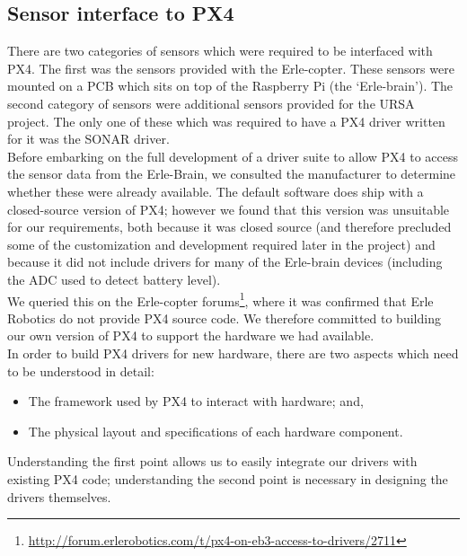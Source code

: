 \documentclass[capstone_report.tex]{subfiles}
\begin{document}
    \subsection{Sensor interface to PX4}
    There are two categories of sensors which were required to be interfaced with PX4. The first was the sensors provided with the Erle-copter. These sensors were mounted on a PCB which sits on top of the Raspberry Pi (the `Erle-brain'). The second category of sensors were additional sensors provided for the URSA project. The only one of these which was required to have a PX4 driver written for it was the SONAR driver.\\

    Before embarking on the full development of a driver suite to allow PX4 to access the sensor data from the Erle-Brain, we consulted the manufacturer to determine whether these were already available. The default software does ship with a closed-source version of PX4; however we found that this version was unsuitable for our requirements, both because it was closed source (and therefore precluded some of the customization and development required later in the project) and because it did not include drivers for many of the Erle-brain devices (including the ADC used to detect battery level).\\

    We queried this on the Erle-copter forums\footnote{\url{http://forum.erlerobotics.com/t/px4-on-eb3-access-to-drivers/2711}}, where it was confirmed that Erle Robotics do not provide PX4 source code. We therefore committed to building our own version of PX4 to support the hardware we had available.\\

    In order to build PX4 drivers for new hardware, there are two aspects which need to be understood in detail:
    \begin{itemize}
        \item The framework used by PX4 to interact with hardware; and,
        \item The physical layout and specifications of each hardware component.
    \end{itemize}

    Understanding the first point allows us to easily integrate our drivers with existing PX4 code; understanding the second point is necessary in designing the drivers themselves.\\
\end{document}
